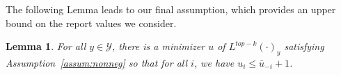 \documentclass[12pt]{article}
\newcommand{\Comments}{1}
\newcommand{\mynote}[2]{\ifnum\Comments=1\textcolor{#1}{#2}\fi}
\newcommand{\jessie}[1]{\mynote{purple}{[JF: #1]}}
\newcommand{\Y}{\mathcal{Y}}
\newtheorem{lemma}{Lemma}
\begin{document}

The following Lemma leads to our final assumption, which provides an upper bound on the report values we consider.

\begin{lemma}\label{lem:top-threshold}
	For all $y \in \Y$, there is a minimizer $u$ of $L^{top-k}(\cdot)_y$ satisfying Assumption~\ref{assum:nonneg} so that for all $i$, we have $u_i \leq \bar u_{-i} +1$. 
\end{lemma}
\end{document}
